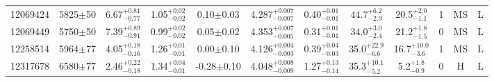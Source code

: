 \begin{landscape}
\begin{longtable}{c|ccccc|ccc|ccc}
	12069424 & 5825$\pm$50   & 6.67$_{-0.77}^{+0.81}$    & 1.05$_{-0.02}^{+0.02}$ & 0.10$\pm$0.03     & 4.287$_{-0.007}^{+0.007}$ & 0.40$_{-0.01}^{+0.01}$ & 44.7$_{-2.9}^{+6.2}$      & 20.5$_{-1.1}^{+2.0}$     & 1 &        MS & L \\
	12069449 & 5750$\pm$50   & 7.39$_{-0.91}^{+0.89}$    & 0.99$_{-0.02}^{+0.02}$ & 0.05$\pm$0.02     & 4.353$_{-0.005}^{+0.007}$ & 0.31$_{-0.01}^{+0.01}$ & 34.0$_{-2.4}^{+3.0}$      & 21.2$_{-1.5}^{+1.8}$     & 0 &        MS & L \\
	12258514 & 5964$\pm$77   & 4.05$_{-0.16}^{+0.18}$    & 1.26$_{-0.01}^{+0.01}$ & 0.00$\pm$0.10     & 4.126$_{-0.003}^{+0.004}$ & 0.39$_{-0.03}^{+0.04}$ & 35.0$_{-6.6}^{+22.9}$     & 16.7$_{-3.6}^{+10.0}$    & 1 &        MS & L \\
	12317678 & 6580$\pm$77   & 2.46$_{-0.18}^{+0.22}$    & 1.34$_{-0.01}^{+0.04}$ & -0.28$\pm$0.10    & 4.048$_{-0.009}^{+0.008}$ & 1.27$_{-0.14}^{+0.13}$ & 35.3$_{-5.2}^{+10.1}$     & 5.2$_{-0.9}^{+1.8}$      & 0 &        H & L \\
\end{longtable}
\normalsize
\end{landscape}